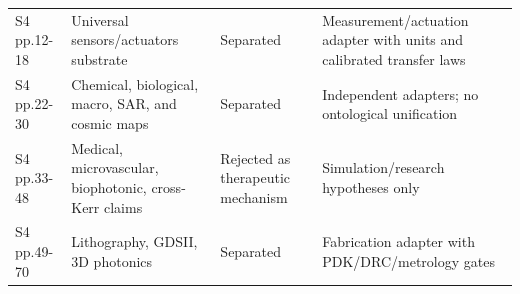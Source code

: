 \begin{longtable}{@{}L{0.13\textwidth}L{0.23\textwidth}L{0.16\textwidth}L{0.38\textwidth}@{}}
S4 pp.12-18 & Universal sensors/actuators substrate & Separated & Measurement/actuation adapter with units and calibrated transfer laws \\
S4 pp.22-30 & Chemical, biological, macro, SAR, and cosmic maps & Separated & Independent adapters; no ontological unification \\
S4 pp.33-48 & Medical, microvascular, biophotonic, cross-Kerr claims & Rejected as therapeutic mechanism & Simulation/research hypotheses only \\
S4 pp.49-70 & Lithography, GDSII, 3D photonics & Separated & Fabrication adapter with PDK/DRC/metrology gates \\
\bottomrule
\end{longtable}